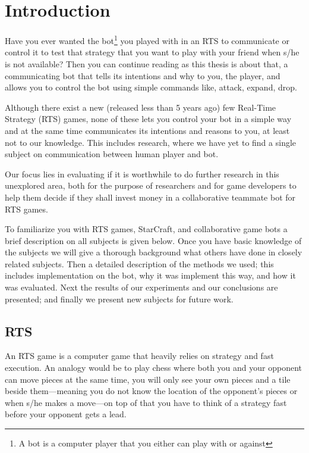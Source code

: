 \chapter{Introduction}
Have you ever wanted the bot\footnote{A bot is a computer player that you either can play with or against} you played with in an RTS to communicate or control it to test that strategy that you want to play with your friend when s/he is not available? Then you can continue reading as this thesis is about that, a communicating bot that tells its intentions and why to you, the player, and allows you to control the bot using simple commands like, attack, expand, drop.

Although there exist a new (released less than 5 years ago) few Real-Time Strategy (RTS) games, none of these lets you control your bot in a simple way and at the same time communicates its intentions and reasons to you, at least not to our knowledge. This includes research, where we have yet to find a single subject on communication between human player and bot.

Our focus lies in evaluating if it is worthwhile to do further research in this unexplored area, both for the purpose of researchers and for game developers to help them decide if they shall invest money in a collaborative teammate bot for RTS games.

To familiarize you with RTS games, StarCraft, and collaborative game bots a brief description on all subjects is given below. Once you have basic knowledge of the subjects we will give a thorough background what others have done in closely related subjects. Then a detailed description of the methods we used; this includes implementation on the bot, why it was implement this way, and how it was evaluated. Next the results of our experiments and our conclusions are presented; and finally we present new subjects for future work.

\section{RTS}
An RTS game is a computer game that heavily relies on strategy and fast execution. An analogy would be to play chess where both you and your opponent can move pieces at the same time, you will only see your own pieces and a tile beside them—meaning you do not know the location of the opponent’s pieces or when s/he makes a move—on top of that you have to think of a strategy fast before your opponent gets a lead.

